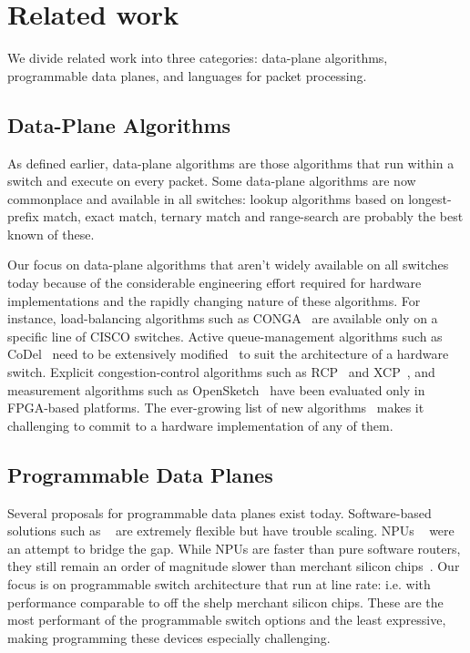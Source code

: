 \section{Related work}
\label{s:related}

We divide related work into three categories: data-plane algorithms, programmable
data planes, and languages for packet processing.

\subsection{Data-Plane Algorithms} 
As defined earlier, data-plane algorithms are those algorithms that run within
a switch and execute on every packet. Some data-plane algorithms are now
commonplace and available in all switches: lookup algorithms based on
longest-prefix match, exact match, ternary match and range-search are probably
the best known of these.

  Our focus on data-plane algorithms that aren't widely available on all
switches today because of the considerable engineering effort required for
hardware implementations and the rapidly changing nature of these algorithms.
For instance, load-balancing algorithms such as CONGA~\cite{conga} are
available only on a specific line of CISCO switches.  Active queue-management
algorithms such as CoDel~\cite{codel} need to be extensively
modified~\cite{pie} to suit the architecture of a hardware switch.  Explicit
congestion-control algorithms such as RCP~\cite{rcp} and XCP~\cite{xcp}, and
measurement algorithms such as OpenSketch~\cite{opensketch} have been evaluated
only in FPGA-based platforms.  The ever-growing list of new
algorithms~\cite{pdq, d3, detail} makes it challenging to commit to a hardware
implementation of any of them.

\subsection{Programmable Data Planes}
Several proposals for programmable data planes exist today. Software-based
solutions such as ~\cite{click, fastpass, flexplane} are extremely flexible but
have trouble scaling. NPUs ~\cite{intel} were an attempt to bridge the gap.
While NPUs are faster than pure software routers, they still remain an order of
magnitude slower than merchant silicon chips~\cite{rmt}. Our focus is on
programmable switch architecture that run at line rate: i.e. with performance
comparable to off the shelp merchant silicon chips. These are the most
performant of the programmable switch options and the least expressive, making
programming these devices especially challenging.

